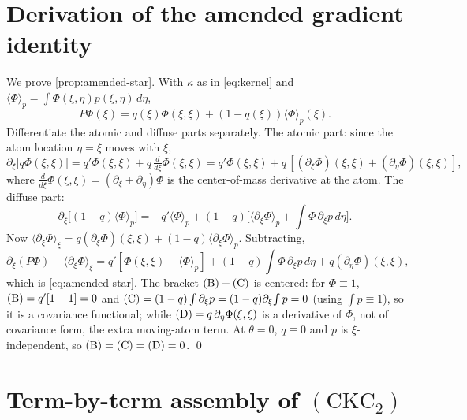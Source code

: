 \documentclass[reqno,final,11pt]{amsart}
\theoremstyle{plain}
\theoremstyle{definition}
\theoremstyle{remark}
\newcommand{\CKC}{(\mathrm{CKC}_{2})}
\begin{document}
\appendix

\section{Derivation of the amended gradient identity}\label{app:amended}

We prove \cref{prop:amended-star}. With $\kappa$ as in \eqref{eq:kernel} and
$\langle\Phi\rangle_p=\int\Phi(\xi,\eta)p(\xi,\eta)\,d\eta$,
\[
  P\Phi(\xi)=q(\xi)\Phi(\xi,\xi)+(1-q(\xi))\langle\Phi\rangle_p(\xi).
\]
Differentiate the atomic and diffuse parts separately. The atomic part:
since the atom location $\eta=\xi$ moves with $\xi$,
\[
  \partial_\xi\bigl[q\Phi(\xi,\xi)\bigr]
  =q'\Phi(\xi,\xi)+q\,\tfrac{d}{d\xi}\Phi(\xi,\xi)
  =q'\Phi(\xi,\xi)+q\,[(\partial_\xi\Phi)(\xi,\xi)+(\partial_\eta\Phi)(\xi,\xi)],
\]
where $\tfrac{d}{d\xi}\Phi(\xi,\xi)=(\partial_\xi+\partial_\eta)\Phi$ is the
center-of-mass derivative at the atom. The diffuse part:
\[
  \partial_\xi\bigl[(1-q)\langle\Phi\rangle_p\bigr]
  =-q'\langle\Phi\rangle_p+(1-q)\bigl[\langle\partial_\xi\Phi\rangle_p
   +\textstyle\int\Phi\,\partial_\xi p\,d\eta\bigr].
\]
Now $\langle\partial_\xi\Phi\rangle_\xi=q(\partial_\xi\Phi)(\xi,\xi)
+(1-q)\langle\partial_\xi\Phi\rangle_p$. Subtracting,
\[
  \partial_\xi(P\Phi)-\langle\partial_\xi\Phi\rangle_\xi
  =q'[\Phi(\xi,\xi)-\langle\Phi\rangle_p]
   +(1-q)\textstyle\int\Phi\,\partial_\xi p\,d\eta
   +q(\partial_\eta\Phi)(\xi,\xi),
\]
which is \eqref{eq:amended-star}. The bracket $\textnormal{(B)}+\textnormal{(C)}$
is centered: for $\Phi\equiv1$, $\textnormal{(B)}=q'[1-1]=0$ and
$\textnormal{(C)}=(1-q)\int\partial_\xi p=(1-q)\partial_\xi\!\int p=0$
(using $\int p\equiv1$), so it is a covariance functional; while
$\textnormal{(D)}=q\,\partial_\eta\Phi(\xi,\xi)$ is a derivative of $\Phi$,
not of covariance form, the extra moving-atom term. At
$\theta=0$, $q\equiv0$ and $p$ is $\xi$-independent, so
$\textnormal{(B)}=\textnormal{(C)}=\textnormal{(D)}=0$. \qed

\section{Term-by-term assembly of \texorpdfstring{$\CKC$}{CKC}}\label{app:assembly}
\end{document}
